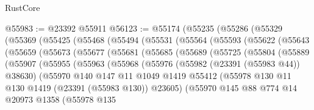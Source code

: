 \begin{lexlean}{RustCore}
\begin{coremodule}
@55983 := @23392 @55911
@56123 := @55174
    (@55235
      (@55286
        (@55329
          (@55369
            (@55425
              (@55468
                (@55494
                  (@55531
                    (@55564
                      (@55593
                        (@55622
                          (@55643
                            (@55659
                              (@55673
                                (@55677
                                  (@55681
                                    (@55685
                                      (@55689
                                        (@55725
                                          (@55804
                                            (@55889
                                              (@55907
                                                (@55955
                                                  (@55963
                                                    (@55968
                                                      (@55976
                                                        (@55982 (@23391 (@55983 @44)) @38630)
                                                        (@55970
                                                          @140
                                                          @147
                                                          @11
                                                          @1049
                                                          @1419
                                                          @55412
                                                          (@55978
                                                            @130
                                                            @11
                                                            @130
                                                            @1419
                                                            (@23391 (@55983 @130))
                                                            @23605)
                                                          (@55970
                                                            @145
                                                            @88
                                                            @774
                                                            @14
                                                            @20973
                                                            @1358
                                                            (@55978
                                                              @135

\end{coremodule}
\end{lexlean}
